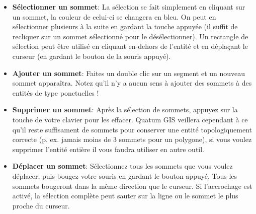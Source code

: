 \begin{itemize}[label=--]
\item \textbf{Sélectionner un sommet}: La sélection se fait simplement en cliquant sur un sommet, la couleur de celui-ci se changera en bleu. On peut en sélectionner plusieurs à la suite en gardant la touche  appuyée (il suffit de recliquer sur un sommet sélectionné pour le désélectionner). Un rectangle de sélection peut être utilisé en cliquant en-dehors de l'entité et en déplaçant le curseur (en gardant le bouton de la souris appuyé). 
\item \textbf{Ajouter un sommet}: Faites un double clic sur un segment et un nouveau sommet apparaîtra. Notez qu'il n'y a aucun sens à ajouter des sommets à des entités de type ponctuelles !
\item \textbf{Supprimer un sommet}: Après la sélection de sommets, appuyez sur la touche  de votre clavier pour les effacer. Quatum GIS veillera cependant à ce qu'il reste suffisament de sommets pour conserver une entité topologiquement correcte (p. ex. jamais moins de 3 sommets pour un polygone), si vous voulez supprimer l'entité entière il vous faudra utiliser en autre outil.
\item \textbf{Déplacer un sommet}: Sélectionnez tous les sommets que vous voulez déplacer, puis bougez votre souris en gardant le bouton appuyé. Tous les sommets bougeront dans la même direction que le curseur. Si l'accrochage est activé, la sélection complète peut sauter sur la ligne ou le sommet le plus proche du curseur.
\end{itemize}

